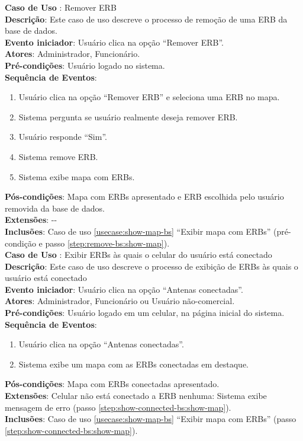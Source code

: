 \documentclass[]{politex}
\begin{document}
\noindent \textbf{Caso de Uso }: Remover ERB \\
\textbf{Descrição}: Este caso de uso descreve o processo de remoção de uma ERB
da base de dados. \\
\textbf{Evento iniciador}: Usuário clica na opção ``Remover ERB''. \\
\textbf{Atores}: Administrador, Funcionário. \\
\textbf{Pré-condições}: Usuário logado no sistema. \\
\textbf{Sequência de Eventos}:
\begin{enumerate}
\item Usuário clica na opção ``Remover ERB'' e seleciona uma ERB no mapa.
\item Sistema pergunta se usuário realmente deseja remover ERB.
\item Usuário responde ``Sim''.
\item Sistema remove ERB.
\item\label{step:remove-bs:show-map} Sistema exibe mapa com ERBs.
\end{enumerate}
\textbf{Pós-condições}: Mapa com ERBs apresentado e ERB escolhida pelo usuário
removida da base de dados. \\
\textbf{Extensões}: -{}- \\
\textbf{Inclusões}: Caso de uso \ref{usecase:show-map-bs} ``Exibir mapa com
ERBs'' (pré-condição e passo \ref{step:remove-bs:show-map}). \\

\noindent \textbf{Caso de Uso }: Exibir ERBs às quais
o celular do usuário está
conectado \\
\textbf{Descrição}: Este caso de uso descreve o processo de exibição de ERBs às
quais o usuário está conectado \\
\textbf{Evento iniciador}: Usuário clica na opção ``Antenas conectadas''. \\
\textbf{Atores}: Administrador, Funcionário ou Usuário não-comercial. \\
\textbf{Pré-condições}: Usuário logado em um celular, na página inicial do
sistema. \\
\textbf{Sequência de Eventos}:
\begin{enumerate}
\item Usuário clica na opção ``Antenas conectadas''.
\item\label{step:show-connected-bs:show-map} Sistema exibe um mapa com as ERBs
conectadas em destaque.
\end{enumerate}
\textbf{Pós-condições}: Mapa com ERBs conectadas apresentado. \\
\textbf{Extensões}: Celular não está conectado a ERB nenhuma: Sistema exibe
mensagem de erro (passo \ref{step:show-connected-bs:show-map}). \\
\textbf{Inclusões}: Caso de uso \ref{usecase:show-map-bs} ``Exibir mapa com
ERBs'' (passo \ref{step:show-connected-bs:show-map}). \\
\end{document}
